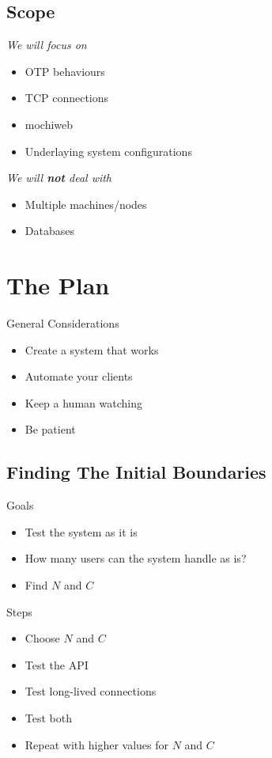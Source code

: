 \documentclass[utf8]{beamer}
\begin{document}
\subsection{Scope}
\begin{frame}
	\emph{We will focus on}
	\begin{itemize}
		\item OTP behaviours
		\item TCP connections
		\item mochiweb
		\item Underlaying system configurations
	\end{itemize}
	\pause
	\emph{We will \textbf{not} deal with}
	\begin{itemize}
		\item Multiple machines/nodes
		\item Databases
	\end{itemize}
\end{frame}

\section{The Plan}
\begin{frame}
\end{frame}

\begin{frame}{General Considerations}
	\begin{itemize}
		\item<1,5> Create a system that \alert{works}
		\item<2,5> Automate your clients
		\item<3,5> Keep a human watching
		\item<4,5> Be patient
	\end{itemize}
\end{frame}

\subsection{Finding The Initial Boundaries}
\begin{frame}{Goals}
	\begin{itemize}
		\item Test the system as it is
		\item How many users can the system handle \alert{as is}?
		\item Find $N$ and $C$
	\end{itemize}
\end{frame}
\begin{frame}{Steps}
	\begin{itemize}
		\item Choose $N$ and $C$
		\item Test the API
		\item Test long-lived connections
		\item Test both
		\pause
		\item Repeat with higher values for $N$ and $C$
	\end{itemize}
\end{frame}
\end{document}
